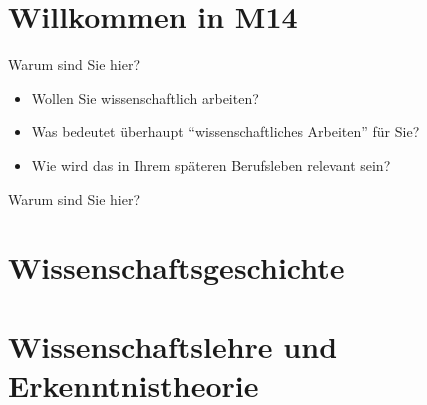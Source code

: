 \documentclass{beamer}
\begin{document}

\section{Willkommen in M14}


\begin{frame}{Warum sind Sie hier?}

\begin{itemize}
    \item 
Wollen Sie wissenschaftlich arbeiten?
\item 
Was bedeutet überhaupt  ``wissenschaftliches Arbeiten'' für Sie? 
\item 
Wie wird das in Ihrem späteren Berufsleben relevant sein? 
    
\end{itemize}
    
\end{frame}

\begin{frame}{Warum sind Sie hier?}


\end{frame}




\section{Wissenschaftsgeschichte}




\section{Wissenschaftslehre und Erkenntnistheorie}




\end{document}
